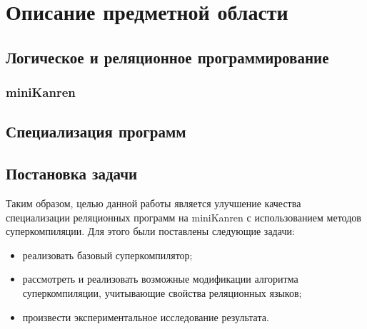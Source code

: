 \section{Описание предметной области}

\subsection{Логическое и реляционное программирование}




\subsubsection{miniKanren}



\subsection{Специализация программ}



\subsection{Постановка задачи}

Таким образом, целью данной работы является улучшение качества специализации
реляционных программ на miniKanren с использованием методов суперкомпиляции.
Для этого были поставлены следующие задачи:
\begin{itemize}
\item реализовать базовый суперкомпилятор;
\item рассмотреть и реализовать возможные модификации алгоритма суперкомпиляции,
      учитывающие свойства реляционных языков;
\item произвести экспериментальное исследование результата.
\end{itemize}
